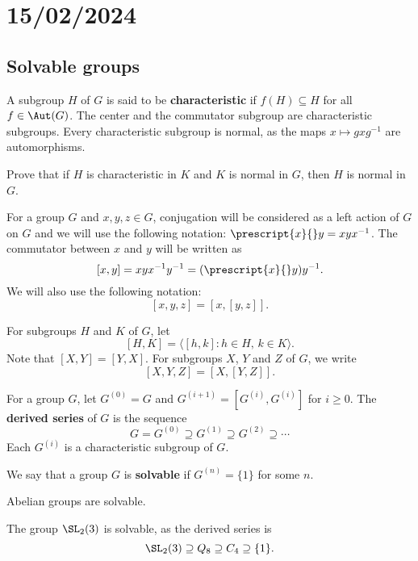 \section{15/02/2024}

\subsection{Solvable groups}

A subgroup $H$ of $G$ is said to be \textbf{characteristic} if 
$f(H)\subseteq H$ for all $f\in\Aut(G)$. 
The center and the commutator subgroup are
characteristic subgroups. 
Every characteristic subgroup is normal, 
as the maps $x\mapsto gxg^{-1}$ are automorphisms. 

\begin{exercise}
    Prove that if $H$ is characteristic in $K$ and $K$ is normal in $G$, then
    $H$ is normal in $G$. 
\end{exercise}

For a group $G$ and $x,y,z\in G$, conjugation will be considered as a left action of $G$ on $G$ 
and we will use the following notation: $\prescript{x}{}y=xyx^{-1}$. The commutator between $x$ and $y$ 
will be written as 
\[
[x,y]=xyx^{-1}y^{-1}=(\prescript{x}{}y)y^{-1}.
\]
We will also use the following notation:  
\[
[x,y,z]=[x,[y,z]].
\]

For subgroups $H$ and $K$ of $G$, let 
\[
[H,K]=\langle [h,k]:h\in H,\,k\in K\rangle.
\]
Note that $[X,Y]=[Y,X]$. 
For subgroups $X$, $Y$ and $Z$ of $G$, we write 
\[
[X,Y,Z]=\left[ X,[Y,Z] \right].
\]

For a group $G$, let 
$G^{(0)}=G$ and 
$G^{(i+1)}=[G^{(i)},G^{(i)}]$ for $i\geq0$.
The \textbf{derived series} of $G$ is the sequence
\[
G=G^{(0)}\supseteq G^{(1)}\supseteq G^{(2)}\supseteq\cdots
\]
Each $G^{(i)}$ is a characteristic subgroup of $G$.

\begin{definition}
We say that a group 
$G$ is \textbf{solvable} if $G^{(n)}=\{1\}$ for some $n$.  
\end{definition}

\begin{example}
	Abelian groups are solvable. 
\end{example}

\begin{example}
	The group $\SL_2(3)$ is solvable, as the derived series is 
	\[
	\SL_2(3)\supseteq Q_8\supseteq C_4\supseteq \{1\}.
	\]
\end{example}

